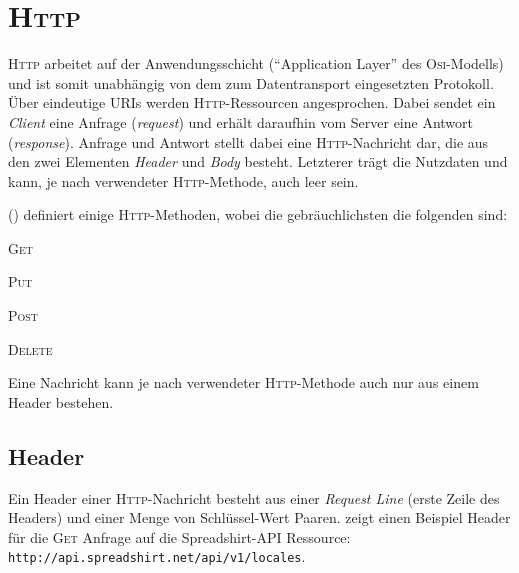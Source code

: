 \section{\textsc{Http}}
\label{sec:http}


\textsc{Http} arbeitet auf der Anwendungsschicht (\enquote{Application Layer} des \textsc{Osi}-Modells) und ist somit unabhängig von dem zum Datentransport eingesetzten Protokoll. 
Über eindeutige \glspl{URI} werden \textsc{Http}-Ressourcen angesprochen. Dabei sendet ein \emph{Client} eine Anfrage (\emph{request}) und erhält daraufhin vom Server eine Antwort (\emph{response}). Anfrage und Antwort stellt dabei eine \textsc{Http}-Nachricht dar, die aus den zwei Elementen \emph{Header} und \emph{Body} besteht. Letzterer trägt die Nutzdaten und kann, je nach verwendeter \textsc{Http}-Methode, auch leer sein.

 (\cite{rfc2616}) definiert einige \textsc{Http}-Methoden, wobei die gebräuchlichsten die folgenden sind:
\begin{compactitem}
    \item \textsc{Get}
    \item \textsc{Put}
    \item \textsc{Post}
    \item \textsc{Delete}
\end{compactitem}

Eine Nachricht kann je nach verwendeter \textsc{Http}-Methode auch nur aus einem Header bestehen.

\subsection{Header}
\label{sec:http-header}

Ein Header einer \textsc{Http}-Nachricht besteht aus einer \emph{Request Line} (erste Zeile des Headers) und einer Menge von Schlüssel-Wert Paaren.  zeigt einen Beispiel Header für die \textsc{Get} Anfrage auf die Spreadshirt-\gls{API} Ressource:
\texttt{http://api.spreadshirt.net/api/v1/locales}.

